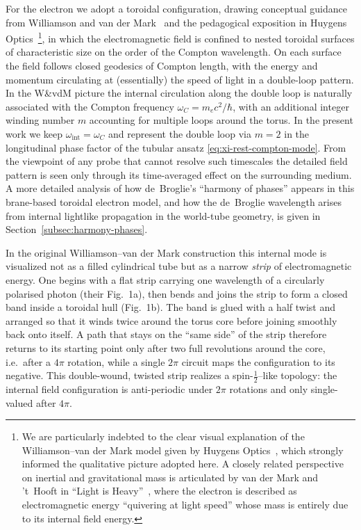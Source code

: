 For the electron we adopt a toroidal configuration, drawing conceptual
guidance from Williamson and van der Mark~\cite{Williamson1997} and the
pedagogical exposition in Huygens Optics~\cite{HuygensOptics2025}\footnote{%
We are particularly indebted to the clear visual explanation of the
Williamson--van der Mark model given by Huygens Optics~\cite{HuygensOptics2025},
which strongly informed the qualitative picture adopted here. A closely
related perspective on inertial and gravitational mass is articulated
by van der Mark and 't~Hooft in ``Light is Heavy''~\cite{vanderMark2000LightHeavy},
where the electron is described as electromagnetic energy ``quivering at
light speed'' whose mass is entirely due to its internal field energy.}, in which
the electromagnetic field is confined to nested toroidal surfaces of
characteristic size on the order of the Compton wavelength. On each
surface the field follows closed geodesics of Compton length, with the
energy and momentum circulating at (essentially) the speed of light in
a double-loop pattern. In the W\&vdM picture the internal circulation
along the double loop is naturally associated with the Compton frequency
$\omega_C = m_e c^2/\hbar$, with an additional integer winding number
$m$ accounting for multiple loops around the torus. In the present work
we keep $\omega_{\text{int}} = \omega_C$ and represent the double loop
via $m=2$ in the longitudinal phase factor of the tubular ansatz
\eqref{eq:xi-rest-compton-mode}. From the viewpoint of any
probe that cannot resolve such timescales the detailed field pattern is
seen only through its time-averaged effect on the surrounding medium.
A more detailed analysis of how de~Broglie's ``harmony of phases''
appears in this brane-based toroidal electron model, and how the
de~Broglie wavelength arises from internal lightlike propagation in
the world-tube geometry, is given in
Section~\ref{subsec:harmony-phases}.

In the original Williamson--van der Mark construction this internal mode
is visualized not as a filled cylindrical tube but as a narrow
\emph{strip} of electromagnetic energy. One begins with a flat strip
carrying one wavelength of a circularly polarised photon (their
Fig.~1a), then bends and joins the strip to form a closed band inside a
toroidal hull (Fig.~1b). The band is glued with a half twist and arranged
so that it winds twice around the torus core before joining smoothly
back onto itself. A path that stays on the ``same side'' of the strip
therefore returns to its starting point only after two full revolutions
around the core, i.e.\ after a $4\pi$ rotation, while a single $2\pi$
circuit maps the configuration to its negative. This double-wound,
twisted strip realizes a spin-$\tfrac12$--like topology: the internal
field configuration is anti-periodic under $2\pi$ rotations and only
single-valued after $4\pi$.

